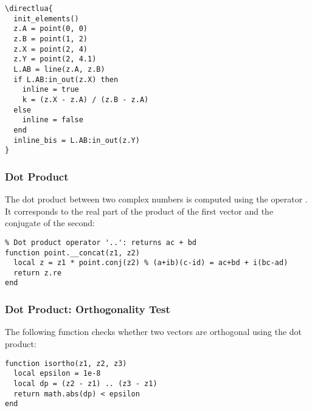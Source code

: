 \begin{minipage}{.5\textwidth}
\begin{verbatim}
\directlua{
  init_elements()
  z.A = point(0, 0)
  z.B = point(1, 2)
  z.X = point(2, 4)
  z.Y = point(2, 4.1)
  L.AB = line(z.A, z.B)
  if L.AB:in_out(z.X) then
    inline = true
    k = (z.X - z.A) / (z.B - z.A)
  else
    inline = false
  end
  inline_bis = L.AB:in_out(z.Y)
}
\end{verbatim}
\end{minipage}
\begin{minipage}{.5\textwidth}
\begin{center}
\end{center}
\end{minipage}

\subsubsection{Dot Product}
\label{ssub:scalar_product}

The dot product between two complex numbers is computed using the operator . It corresponds to the real part of the product of the first vector and the conjugate of the second:

\begin{verbatim}
% Dot product operator '..': returns ac + bd
function point.__concat(z1, z2)
  local z = z1 * point.conj(z2) % (a+ib)(c-id) = ac+bd + i(bc-ad)
  return z.re
end
\end{verbatim}

\subsubsection{Dot Product: Orthogonality Test}
\label{ssub:scalar_product_orthogonality_test}

The following function  checks whether two vectors are orthogonal using the dot product:

\begin{verbatim}
function isortho(z1, z2, z3)
  local epsilon = 1e-8
  local dp = (z2 - z1) .. (z3 - z1)
  return math.abs(dp) < epsilon
end
\end{verbatim}

